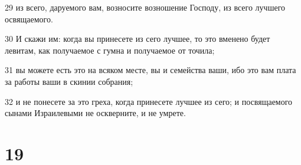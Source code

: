 \par 29 из всего, даруемого вам, возносите возношение Господу, из всего лучшего освящаемого.
\par 30 И скажи им: когда вы принесете из сего лучшее, то это вменено будет левитам, как получаемое с гумна и получаемое от точила;
\par 31 вы можете есть это на всяком месте, вы и семейства ваши, ибо это вам плата за работы ваши в скинии собрания;
\par 32 и не понесете за это греха, когда принесете лучшее из сего; и посвящаемого сынами Израилевыми не оскверните, и не умрете.

\chapter{19}

